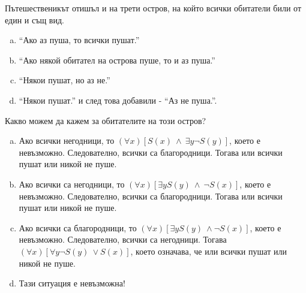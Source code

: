 \begin{problem}
  Пътешественикът отишъл и на трети остров, на който всички обитатели били от един и същ вид.
  \begin{enumerate}[a)]
  \item
    ``Ако аз пуша, то всички пушат.''
  \item
    ``Ако някой обитател на острова пуше, то и аз пуша.''
  \item
    ``Някои пушат, но аз не.''
  \item
    ``Някои пушат.'' и след това добавили - ``Аз не пуша.''.
  \end{enumerate}
  Какво можем да кажем за обитателите на този остров?
\end{problem}
\begin{solution}
  \begin{enumerate}[a)]
  \item
    Ако всички негодници, то $(\forall x)[S(x)\ \wedge\ \exists y\neg S(y)]$,
    което е невъзможно.
    Следователно, всички са благородници. Тогава или всички пушат или никой не пуше.
  \item
    Ако всички са негодници, то $(\forall x)[\exists y S(y)\ \wedge\ \neg S(x)]$,
    което е невъзможно. Следователно, всички са благородници.
    Тогава или всички пушат или никой не пуше.
  \item
    Ако всички са благородници, то $(\forall x)[\exists y S(y)\ \wedge \neg S(x)]$,
    което е невъзможно. Следователно, всички  са негодници.
    Тогава $(\forall x)[\forall y\neg S(y)\ \vee S(x)]$, което означава, че
    или всички пушат или никой не пуше.
  \item
    Тази ситуация е невъзможна!
  \end{enumerate}
\end{solution}


